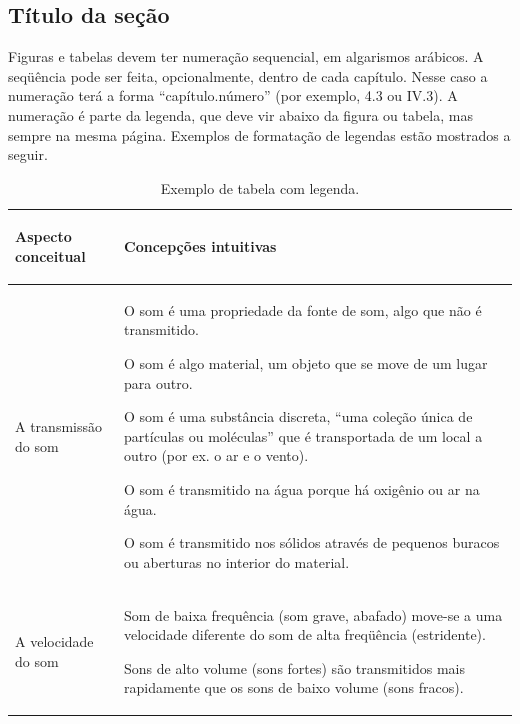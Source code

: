 \documentclass[a4paper,12pt,oneside]{book}
\begin{document}
\subsection{Título da seção}

Figuras e tabelas devem ter numeração sequencial, em algarismos arábicos. A seqüência pode ser feita, opcionalmente, dentro de cada capítulo. Nesse caso a numeração terá a forma “capítulo.número” (por exemplo, 4.3 ou IV.3). A numeração é parte da legenda, que deve vir abaixo da figura ou tabela, mas sempre na mesma página. Exemplos de formatação de legendas estão mostrados a seguir.

\begin{table}[H]
 \begin{center}
 \begin{tabular}{ |p{4cm}|p{10cm}| }
\hline
\begin{center} \textbf{Aspecto conceitual} \end{center}   & \begin{center}  \textbf{Concepções intuitivas} \end{center}   \\ \hline
    A transmissão do som      &  O som é uma propriedade da fonte de som, algo que não é transmitido.
                                 
                                 O som é algo material, um objeto que se move de um lugar para outro.
                                 
                                 O som é uma substância discreta, “uma coleção única de partículas ou moléculas”     que é transportada de um local a outro (por ex. o ar e o vento).
                                 
                                 O som é transmitido na água porque há oxigênio ou ar na água.
                                 
                                 O som é transmitido nos sólidos através de pequenos buracos ou aberturas no interior do material. \\ \hline
    
 A velocidade do som           &  Som de baixa frequência (som grave, abafado) move-se a uma velocidade diferente do som de alta freqüência (estridente).
    
    Sons de alto volume (sons fortes) são transmitidos mais rapidamente que os sons de baixo volume (sons fracos). \\ \hline
  \end{tabular}
  \caption{Exemplo de tabela com legenda.\label{Tabela_2.1}}
\end{center}
\end{table}
\end{document}
